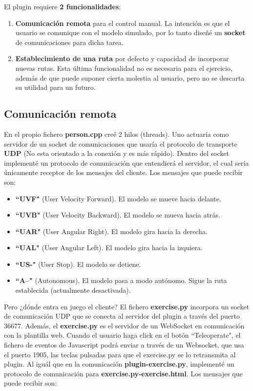 El plugin requiere \textbf{2 funcionalidades}:
\begin{enumerate}
	\item \textbf{Comunicación remota} para el control manual. La intención es que el usuario se comunique con el modelo simulado, por lo tanto diseñé un \textbf{socket} de comunicaciones para dicha tarea.
	\item \textbf{Establecimiento de una ruta} por defecto y capacidad de incorporar nuevas rutas. Esta última funcionalidad no es necesaria para el ejercicio, además de que puede suponer cierta molestia al usuario, pero no se descarta su utilidad para un futuro.
\end{enumerate}

\subsection{Comunicación remota}
\label{subsec:comunicacion_remota}

En el propio fichero \textbf{person.cpp} creé 2 hilos (threads). Uno actuaría como servidor de un socket de comunicaciones que usaría el protocolo de transporte \textbf{UDP} (No esta orientado a la conexión y es más rápido). Dentro del socket implementé un protocolo de comunicación que entendierá el servidor, el cual sería únicamente receptor de los mensajes del cliente. Los mensajes que puede recibir son:

\begin{itemize}
	\item \textbf{``UVF"} (User Velocity Forward). El modelo se mueve hacia delante.
	\item \textbf{``UVB"} (User Velocity Backward). El modelo se mueva hacia atrás.
	\item \textbf{``UAR"} (User Angular Right). El modelo gira hacia la derecha.
	\item \textbf{``UAL"} (User Angular Left). El modelo gira hacia la izquiera.
	\item \textbf{``US-"} (User Stop). El modelo se detiene.
	\item \textbf{``A--"} (Autonomous). El modelo pasa a modo autónomo. Sigue la ruta establecida (actualmente desactivada).
\end{itemize}

Pero ¿dónde entra en juego el cliente? El fichero \textbf{exercise.py} incorpora un socket de comunicación UDP que se conecta al servidor del plugin a través del puerto 36677. Además, el \textbf{exercise.py} es el servidor de un WebSocket en comunicación con la plantilla web. Cuando el usuario haga click en el botón ``Teleoperate", el fichero de eventos de Javascript podrá enviar a través de un Websocket, que usa el puerto 1905, las teclas pulsadas para que el exercise.py se lo retransmita al plugin. Al iguál que en la comunicación \textbf{plugin-exercise.py}, implementé un protocolo de comunicación para \textbf{exercise.py-exercise.html}. Los mensajes que puede recibir son:

